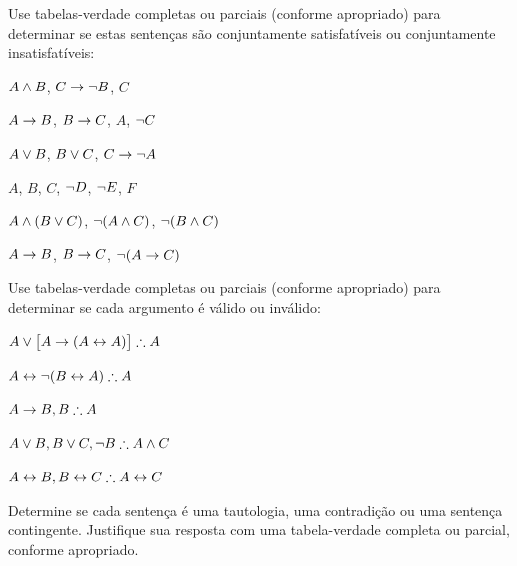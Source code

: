 \problempart
\label{pr.TT.satisfiable4}
Use tabelas-verdade completas ou parciais (conforme apropriado) para determinar se estas sentenças são conjuntamente satisfatíveis ou conjuntamente insatisfatíveis:
\begin{compactlist}
\item $A \wedge B$, $C\rightarrow \neg B$, $C$ %
\item $A\rightarrow B$, $B\rightarrow C$, $A$, $\neg C$ %
\item $A \vee B$, $B\vee C$, $C\rightarrow \neg A$ %
\item $A$, $B$, $C$, $\neg D$, $\neg E$, $F$ %
\item $A \wedge (B \vee C)$, $\neg(A \wedge C)$, $\neg(B \wedge C)$ %
\item $A \rightarrow B$, $B \rightarrow C$, $\neg(A \rightarrow C)$ %
\end{compactlist}

\problempart
\label{pr.TT.valid4}
Use tabelas-verdade completas ou parciais (conforme apropriado) para determinar se cada argumento é válido ou inválido:
\begin{compactlist}
\item $A\eor\bigl[A\eif(A\eiff A)\bigr] \therefore A$ %
\item $A\eiff\enot(B\eiff A) \therefore A$ %
\item $A\eif B, B \therefore A$ %
\item $A\eor B, B\eor C, \enot B \therefore A \eand C$ %
\item $A\eiff B, B\eiff C \therefore A\eiff C$ %
\end{compactlist}

\problempart
\label{pr.TT.TTorC3}
Determine se cada sentença é uma tautologia, uma contradição ou uma sentença contingente. Justifique sua resposta com uma tabela-verdade completa ou parcial, conforme apropriado.


